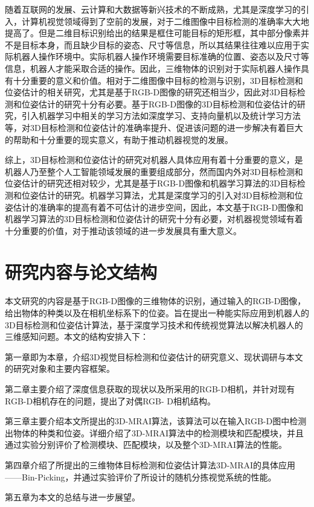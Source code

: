 随着互联网的发展、云计算和大数据等新兴技术的不断成熟，尤其是深度学习的引入，计算机视觉领域得到了空前的发展，对于二维图像中目标检测的准确率大大地提高了。但是二维目标识别给出的结果是框住可能目标的矩形框，其中部分像素并不是目标本身，而且缺少目标的姿态、尺寸等信息，所以其结果往往难以应用于实际机器人操作环境中。实际机器人操作环境需要目标准确的位置、姿态以及尺寸等信息，机器人才能采取合适的操作。因此，三维物体的识别对于实际机器人操作具有十分重要的意义和价值。相对于二维图像中目标的检测与识别，3D目标检测和位姿估计的相关研究，尤其是基于RGB-D图像的研究还相当少，因此对3D目标检测和位姿估计的研究十分有必要。基于RGB-D图像的3D目标检测和位姿估计的研究，引入机器学习中相关的学习方法如深度学习、支持向量机以及统计学习方法等，对3D目标检测和位姿估计的准确率提升、促进该问题的进一步解决有着巨大的帮助和十分重要的现实意义，有助于推动机器视觉的发展。

综上，3D目标检测和位姿估计的研究对机器人具体应用有着十分重要的意义，是机器人乃至整个人工智能领域发展的重要组成部分，然而国内外对3D目标检测和位姿估计的研究还相对较少，尤其是基于RGB-D图像和机器学习算法的3D目标检测和位姿估计的研究。机器学习算法，尤其是深度学习的引入对3D目标检测和位姿估计的准确率的提高有着不可估计的进步空间，因此，本文基于RGB-D图像和机器学习算法的3D目标检测和位姿估计的研究十分有必要，对机器视觉领域有着十分重要的价值，对于推动该领域的进一步发展具有重大意义。

\section{研究内容与论文结构}
本文研究的内容是基于RGB-D图像的三维物体的识别，通过输入的RGB-D图像，给出物体的种类以及在相机坐标系下的位姿。旨在提出一种能实际应用到机器人的3D目标检测和位姿估计算法，基于深度学习技术和传统视觉算法以解决机器人的三维感知问题。本文的结构安排入下：

第一章即为本章，介绍3D视觉目标检测和位姿估计的研究意义、现状调研与本文的研究对象和主要内容框架。

第二章主要介绍了深度信息获取的现状以及所采用的RGB-D相机，并针对现有RGB-D相机存在的问题，提出了对偶RGB-
D相机结构。

第三章主要介绍本文所提出的3D-MRAI算法，该算法可以在输入RGB-D图中检测出物体的种类和位姿。详细介绍了3D-MRAI算法中的检测模块和匹配模块，并且通过实验分别评价了检测模块、匹配模块，以及整个3D-MRAI算法的性能。

第四章介绍了所提出的三维物体目标检测和位姿估计算法3D-MRAI的具体应用——Bin-Picking，并通过实验评价了所设计的随机分拣视觉系统的性能。

第五章为本文的总结与进一步展望。


